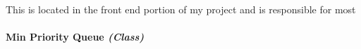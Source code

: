 \begin{FlushLeft}
    \begin{figure}[H]
        \centering
    \end{figure}\\

    This is located in the front end portion of my project and is responsible for most

    \bk
    
    \pagebreak
\paragraph{Min Priority Queue \textit{(Class)}} \mbox{} \\

    \begin{figure}[H]
        \centering
    \end{figure}\\


\end{FlushLeft}
